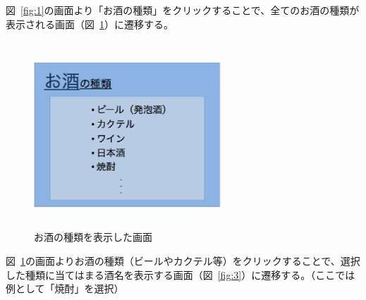 図~\ref{fig:1}の画面より「お酒の種類」をクリックすることで、全てのお酒の種類が表示される画面（図~\ref{fig:2}）に遷移する。
\clearpage
\begin {figure}[!htbp]
    \begin{center}
    \includegraphics [height=7cm, width=7cm]{2.eps}
    \caption {お酒の種類を表示した画面}
    \label {fig:2}
    \end{center}
\end {figure}


図~\ref{fig:2}の画面よりお酒の種類（ビールやカクテル等）をクリックすることで、選択した種類に当てはまる酒名を表示する画面（図~\ref{fig:3}）に遷移する。（ここでは例として「焼酎」を選択）

